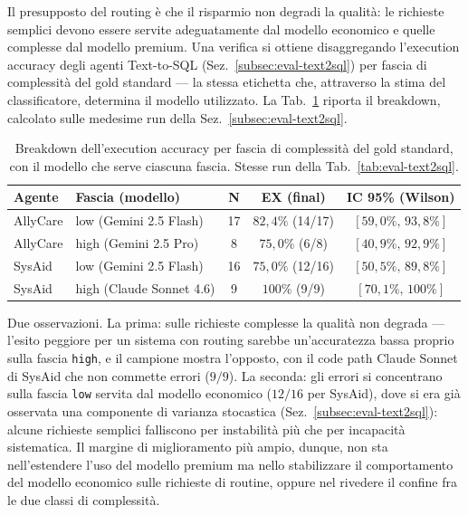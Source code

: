 Il presupposto del routing è che il risparmio non degradi la qualità: le
richieste semplici devono essere servite adeguatamente dal modello
economico e quelle complesse dal modello premium. Una verifica si ottiene
disaggregando l'execution accuracy degli agenti Text-to-SQL
(Sez.~\ref{subsec:eval-text2sql}) per fascia di complessità del gold
standard --- la stessa etichetta che, attraverso la stima del
classificatore, determina il modello utilizzato. La
Tab.~\ref{tab:eval-cq-breakdown} riporta il breakdown, calcolato sulle
medesime run della Sez.~\ref{subsec:eval-text2sql}.

\begin{table}[htbp]
  \centering
  \caption[Execution accuracy per fascia di complessità]{Breakdown dell'execution accuracy per fascia di complessità del gold standard, con il modello che serve ciascuna fascia. Stesse run della Tab.~\ref{tab:eval-text2sql}.}
  \label{tab:eval-cq-breakdown}
  \small
  \begin{tabular}{llccc}
    \toprule
    \textbf{Agente} & \textbf{Fascia (modello)} & \textbf{N} & \textbf{EX (final)} & \textbf{IC 95\% (Wilson)} \\
    \midrule
    AllyCare & low (Gemini 2.5 Flash) & 17 & $82{,}4\%$ (14/17) & $[59{,}0\%,\,93{,}8\%]$ \\
    AllyCare & high (Gemini 2.5 Pro)  & 8  & $75{,}0\%$ (6/8)   & $[40{,}9\%,\,92{,}9\%]$ \\
    SysAid   & low (Gemini 2.5 Flash) & 16 & $75{,}0\%$ (12/16) & $[50{,}5\%,\,89{,}8\%]$ \\
    SysAid   & high (Claude Sonnet 4.6) & 9 & $100\%$ (9/9)     & $[70{,}1\%,\,100\%]$ \\
    \bottomrule
  \end{tabular}
\end{table}

Due osservazioni. La prima: sulle richieste complesse la qualità non
degrada --- l'esito peggiore per un sistema con routing sarebbe
un'accuratezza bassa proprio sulla fascia \texttt{high}, e il campione
mostra l'opposto, con il code path Claude Sonnet di SysAid che non commette
errori ($9/9$). La seconda: gli errori si concentrano sulla fascia
\texttt{low} servita dal modello economico ($12/16$ per SysAid), dove si
era già osservata una componente di varianza stocastica
(Sez.~\ref{subsec:eval-text2sql}): alcune richieste semplici falliscono per
instabilità più che per incapacità sistematica. Il margine di miglioramento
più ampio, dunque, non sta nell'estendere l'uso del modello premium ma nello
stabilizzare il comportamento del modello economico sulle richieste di
routine, oppure nel rivedere il confine fra le due classi di complessità.

